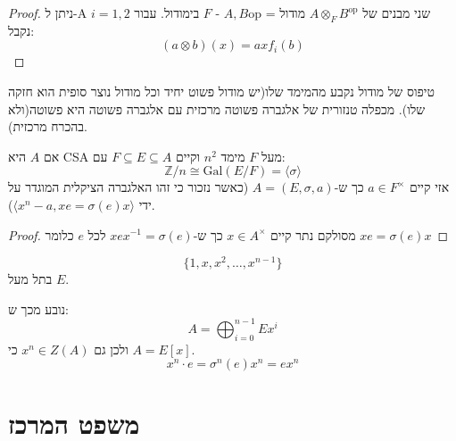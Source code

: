 \documentclass{tstextbook}
\begin{document}
\begin{proof}
ניתן ל-A שני מבנים של \(A\otimes_{F} B^{\text{op}}\) מודול = \(A,B\mathrm{\text{op}}\) - \(F\) בימודול. עבור \(i=1,2\) נקבל:
$$(a\otimes b)(x)=axf_{i}(b)$$

\end{proof}
\begin{reminder}
טיפוס של מודול נקבע מהמימד שלו(יש מודול פשוט יחיד וכל מודול נוצר סופית הוא חזקה שלו).
מכפלה טנזורית של אלגברה פשוטה מרכזית עם אלגברה פשוטה היא פשוטה(ולא בהכרח מרכזית).

\end{reminder}
\begin{corollary}
אם \(A\) היא CSA מעל \(F\) מימד \(n^{2}\) וקיים \(F\subseteq E \subseteq A\) עם:
$$  \mathbb{Z} / n\cong \mathrm{Gal}(E / F)=\langle \sigma \rangle $$
אזי קיים \(a \in F^{\times}\) כך ש-\(A=(E,\sigma,a)\) (כאשר נזכור כי זהו האלגברה הציקלית המוגדר על ידי \(\langle x^{n}-a,xe=\sigma(e)x \rangle\)).

\end{corollary}
\begin{proof}
מסולקם נתר קיים \(x \in A^{\times}\) כך ש-\(xex ^{-1} = \sigma(e)\) לכל \(e\) כלומר \(xe=\sigma(e)x\)

\end{proof}
\begin{proposition}
$$\{ 1,x,x^{2},\dots,x^{n-1} \}$$
בתל מעל \(E\). 

\end{proposition}
נובע מכך ש:
$$A=\bigoplus_{i=0}^{n-1}Ex^{i}$$
ולכן גם \(x^{n}\in Z(A)\) כי \(A=E[x]\). 
$$x^{n}\cdot e=\sigma^{n}(e)x^{n}=ex^{n}$$

\section{משפט המרכז}
\end{document}
